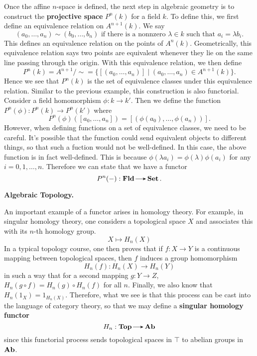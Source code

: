     \begin{example}
        Once the affine $n$-space is defined, the next step in algebraic geometry is to construct 
        the \textbf{projective space} $P^n(k)$ for a field $k$. To define this, we first 
        define an equivalence relation on $A^{n+1}(k)$. We say 
        \[
            (a_0, \dots,  a_n) \sim (b_0, \dots, b_n) \text{ if there is a nonnzero } \lambda \in k \text{ such that } a_i = \lambda b_i.
        \]  
        This defines an equivalence relation on the points of $A^n(k)$. Geometrically, this equivalence relation 
        says two points are equivalent whenever they lie on the same line passing through the origin.
        With this equivalence relation, we then define
        \[
            P^n(k) = A^{n+1}/\sim = \Big\{[(a_0, \dots, a_n)] \mid (a_0, \dots, a_n) \in A^{n+1}(k)\Big\}.
        \]
        Hence we see that $P^n(k)$ is the set of equivalence classes under this equivalence relation. Similar to 
        the previous example, this construction is also functorial. Consider a field homomorphism $\phi: k \to k'$. Then we 
        define the function $P^n(\phi): P^n(k) \to P^n(k')$ where 
        \[
            P^n(\phi)([a_0, \dots, a_n]) = [(\phi(a_0), \dots, \phi(a_n))].           
        \]
        However, when defining functions on a set of equivalence classes, we need to be careful. 
        It's possible that the function could send equivalent objects to different things, so that such 
        a fuction would not be well-defined. In this case, the above function is in fact well-defined. 
        This is because $\phi(\lambda a_i)  =\phi(\lambda) \phi(a_i)$ for any $i = 0, 1, \dots, n$. 
        Therefore we can state that we have a functor 
        \[
            P^n(-): \fld \to \Set.  
        \]
    \end{example}
    \vspace{0.5cm}  

    {\large\noindent \textbf{Algebraic Topology.}\par}

    \begin{example}
        An important example of a
        functor arises in homology theory. For example, in singular homology
        theory, one considers a topological space $X$ and associates this 
        with its $n$-th homology group.
        \[
            X \mapsto H_n(X)
        \]
        In a typical 
        topology course, one then proves that if $f: X \to Y$ is a continuous 
        mapping between topological spaces, then $f$ induces a group homomorphism 
        \[
            H_n(f): H_n(X) \to H_n(Y) 
        \]
        in such a way that for a second mapping $g: Y \to Z$, $H_n(g \circ f) 
        = H_n(g) \circ H_n(f)$ for all $n$. Finally, we also know that 
        $H_n(1_X) = 1_{H_n(X)}$.
        Therefore, what we see is that this process can be cast into the language 
        of category theory, so that we may define a \textbf{singular 
        homology functor}
        \[
            H_n: \top \to \ab
        \]
        since this functorial process sends topological spaces in $\top$
        to abelian groups in $\operatorname{\mathbf{Ab}}$.
    \end{example}

